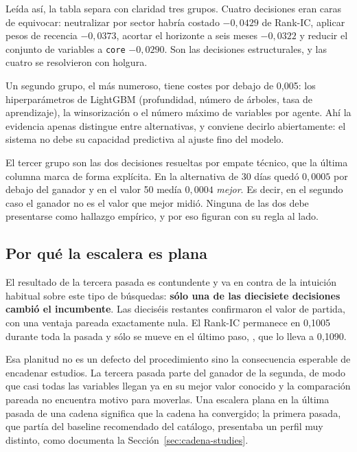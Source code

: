 Leída así, la tabla separa con claridad tres grupos. Cuatro decisiones eran caras de equivocar:
neutralizar por sector habría costado $-0{,}0429$ de Rank-IC, aplicar pesos de recencia $-0{,}0373$,
acortar el horizonte a seis meses $-0{,}0322$ y reducir el conjunto de variables a \texttt{core}
$-0{,}0290$. Son las decisiones estructurales, y las cuatro se resolvieron con holgura.

Un segundo grupo, el más numeroso, tiene costes por debajo de 0,005: los hiperparámetros de LightGBM
(profundidad, número de árboles, tasa de aprendizaje), la winsorización o el número máximo de
variables por agente. Ahí la evidencia apenas distingue entre alternativas, y conviene decirlo
abiertamente: el sistema no debe su capacidad predictiva al ajuste fino del modelo.

El tercer grupo son las dos decisiones resueltas por empate técnico, que la última columna marca de
forma explícita. En  la alternativa de 30 días quedó $0{,}0005$ por
debajo del ganador y en  el valor 50 medía $0{,}0004$
\emph{mejor}. Es decir, en el segundo caso el ganador no es el valor que mejor midió. Ninguna de las
dos debe presentarse como hallazgo empírico, y por eso figuran con su regla al lado.

\subsection*{Por qué la escalera es plana}

El resultado de la tercera pasada es contundente y va en contra de la intuición habitual sobre este
tipo de búsquedas: \textbf{sólo una de las diecisiete decisiones cambió el incumbente}. Las
dieciséis restantes confirmaron el valor de partida, con una ventaja pareada exactamente nula. El
Rank-IC permanece en 0,1005 durante toda la pasada y sólo se mueve en el último paso,
, que lo lleva a 0,1090.

Esa planitud no es un defecto del procedimiento sino la consecuencia esperable de encadenar
estudios. La tercera pasada parte del ganador de la segunda, de modo que casi todas las variables
llegan ya en su mejor valor conocido y la comparación pareada no encuentra motivo para moverlas.
Una escalera plana en la última pasada de una cadena significa que la cadena ha convergido; la
primera pasada, que partía del baseline recomendado del catálogo, presentaba un perfil muy distinto,
como documenta la Sección~\ref{sec:cadena-studies}.

